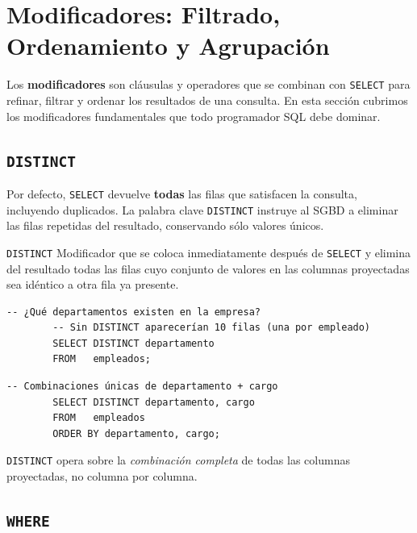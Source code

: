 \documentclass[12pt, a4paper]{article}
\begin{document}
	\section{Modificadores: Filtrado, Ordenamiento y Agrupación}
	
	Los \textbf{modificadores} son cláusulas y operadores que se
	combinan con \texttt{SELECT} para refinar, filtrar y ordenar los
	resultados de una consulta.
	En esta sección cubrimos los modificadores fundamentales que
	todo programador SQL debe dominar.
	
	\subsection{\texttt{DISTINCT}}
	
	Por defecto, \texttt{SELECT} devuelve \textbf{todas} las filas que
	satisfacen la consulta, incluyendo duplicados.
	La palabra clave \texttt{DISTINCT} instruye al SGBD a eliminar las
	filas repetidas del resultado, conservando sólo valores únicos.
	
	\begin{definicion}{\texttt{DISTINCT}}
		Modificador que se coloca inmediatamente después de \texttt{SELECT}
		y elimina del resultado todas las filas cuyo conjunto de valores en
		las columnas proyectadas sea idéntico a otra fila ya presente.
	\end{definicion}
	
	\begin{lstlisting}[caption={DISTINCT sobre una columna.}]
		-- ¿Qué departamentos existen en la empresa?
		-- Sin DISTINCT aparecerían 10 filas (una por empleado)
		SELECT DISTINCT departamento
		FROM   empleados;
	\end{lstlisting}
	
	\begin{lstlisting}[caption={DISTINCT sobre múltiples columnas.}]
		-- Combinaciones únicas de departamento + cargo
		SELECT DISTINCT departamento, cargo
		FROM   empleados
		ORDER BY departamento, cargo;
	\end{lstlisting}
	
	\begin{nota}
		\texttt{DISTINCT} opera sobre la \textit{combinación completa} de
		todas las columnas proyectadas, no columna por columna.
	\end{nota}
	
	\subsection{\texttt{WHERE}}
	
\end{document}
